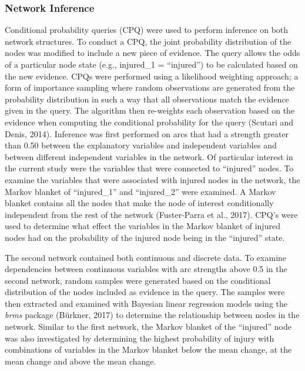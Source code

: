 \documentclass[utf8]{frontiersHLTH}
\begin{document}
\hypertarget{network-inference}{%
\subsubsection*{Network Inference}\label{network-inference}}

Conditional probability queries (CPQ) were used to perform inference on
both network structures. To conduct a CPQ, the joint probability
distribution of the nodes was modified to include a new piece of
evidence. The query allows the odds of a particular node state (e.g.,
injured\_1 = ``injured'') to be calculated based on the new evidence.
CPQs were performed using a likelihood weighting approach; a form of
importance sampling where random observations are generated from the
probability distribution in such a way that all observations match the
evidence given in the query. The algorithm then re-weights each
observation based on the evidence when computing the conditional
probability for the query (Scutari and Denis, 2014). Inference was first
performed on arcs that had a strength greater than 0.50 between the
explanatory variables and independent variables and between different
independent variables in the network. Of particular interest in the
current study were the variables that were connected to ``injured''
nodes. To examine the variables that were associated with injured nodes
in the network, the Markov blanket of ``injured\_1'' and ``injured\_2''
were examined. A Markov blanket contains all the nodes that make the
node of interest conditionally independent from the rest of the network
(Fuster-Parra et al., 2017). CPQ's were used to determine what effect
the variables in the Markov blanket of injured nodes had on the
probability of the injured node being in the ``injured'' state.

The second network contained both continuous and discrete data. To
examine dependencies between continuous variables with arc strengths
above 0.5 in the second network, random samples were generated based on
the conditional distribution of the nodes included as evidence in the
query. The samples were then extracted and examined with Bayesian linear
regression models using the \emph{brms} package (Bürkner, 2017) to
determine the relationship between nodes in the network. Similar to the
first network, the Markov blanket of the ``injured'' node was also
investigated by determining the highest probability of injury with
combinations of variables in the Markov blanket below the mean change,
at the mean change and above the mean change.
\end{document}

